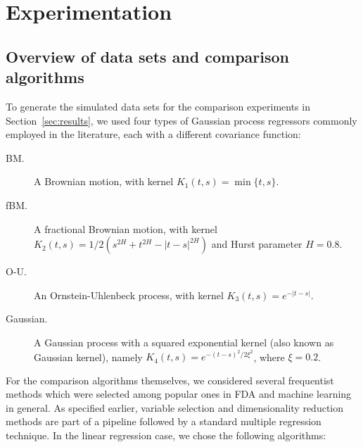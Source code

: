 \newpage
\section{Experimentation}\label{app:experiments}

\subsection{Overview of data sets and comparison algorithms}\label{app:data-sets}

To generate the simulated data sets for the comparison experiments in Section~\ref{sec:results}, we used four types of Gaussian process regressors commonly employed in the literature, each with a different covariance function:
\begin{description}
  \item [BM.] A Brownian motion, with kernel \(K_1(t,s)=\min\{t,s\}\).
  \item [fBM.] A fractional Brownian motion, with kernel \(K_2(t,s)=1/2(s^{2H} + t^{2H} - |t-s|^{2H})\) and Hurst parameter \(H=0.8\).
  \item [O-U.] An Ornstein-Uhlenbeck process, with kernel \(K_3(t,s)=e^{-|t-s|}\).
  \item [Gaussian.] A Gaussian process with a squared exponential kernel (also known as Gaussian kernel), namely \(K_4(t,s)=e^{-(t-s)^2/2\xi^2}\), where \(\xi=0.2\).
\end{description}

For the comparison algorithms themselves, we considered several frequentist methods which were selected among popular ones in FDA and machine learning in general. As specified earlier, variable selection and dimensionality reduction methods are part of a pipeline followed by a standard multiple regression technique. In the linear regression case, we chose the following algorithms:

